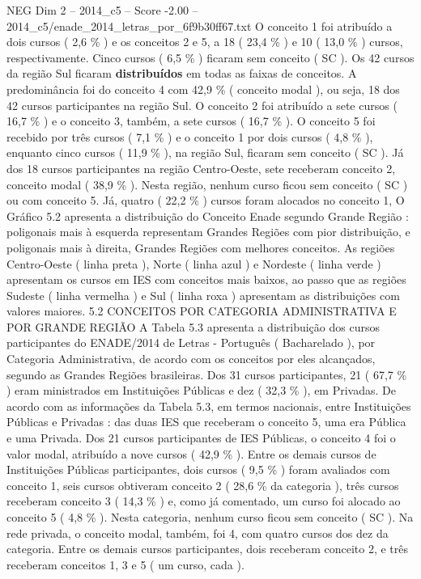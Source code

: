 \begin{textsample}{NEG Dim 2 – 2014\_c5 – Score -2.00 – 2014\_c5/enade\_2014\_letras\_por\_6f9b30ff67.txt}
O conceito 1 foi atribuído a dois cursos ( 2,6 \% ) e os conceitos 2 e 5, a 18 ( 23,4 \% ) e 10 ( 13,0 \% ) cursos, respectivamente.
Cinco cursos ( 6,5 \% ) ficaram sem conceito ( SC ).
Os 42 cursos da região Sul ficaram \textbf{distribuídos} em todas as faixas de conceitos.
A predominância foi do conceito 4 com 42,9 \% ( conceito modal ), ou seja, 18 dos 42 cursos participantes na região Sul.
O conceito 2 foi atribuído a sete cursos ( 16,7 \% ) e o conceito 3, também, a sete cursos ( 16,7 \% ).
O conceito 5 foi recebido por três cursos ( 7,1 \% ) e o conceito 1 por dois cursos ( 4,8 \% ), enquanto cinco cursos ( 11,9 \% ), na região Sul, ficaram sem conceito ( SC ).
Já dos 18 cursos participantes na região Centro-Oeste, sete receberam conceito 2, conceito modal ( 38,9 \% ).
Nesta região, nenhum curso ficou sem conceito ( SC ) ou com conceito 5.
Já, quatro ( 22,2 \% ) cursos foram alocados no conceito 1, O Gráfico 5.2 apresenta a distribuição do Conceito Enade segundo Grande Região : poligonais mais à esquerda representam Grandes Regiões com pior distribuição, e poligonais mais à direita, Grandes Regiões com melhores conceitos.
As regiões Centro-Oeste ( linha preta ), Norte ( linha azul ) e Nordeste ( linha verde ) apresentam os cursos em IES com conceitos mais baixos, ao passo que as regiões Sudeste ( linha vermelha ) e Sul ( linha roxa ) apresentam as distribuições com valores maiores. 5.2 CONCEITOS POR CATEGORIA ADMINISTRATIVA E POR GRANDE REGIÃO A Tabela 5.3 apresenta a distribuição dos cursos participantes do ENADE/2014 de Letras - Português ( Bacharelado ), por Categoria Administrativa, de acordo com os conceitos por eles alcançados, segundo as Grandes Regiões brasileiras.
Dos 31 cursos participantes, 21 ( 67,7 \% ) eram ministrados em Instituições Públicas e dez ( 32,3 \% ), em Privadas.
De acordo com as informações da Tabela 5.3, em termos nacionais, entre Instituições Públicas e Privadas : das duas IES que receberam o conceito 5, uma era Pública e uma Privada.
Dos 21 cursos participantes de IES Públicas, o conceito 4 foi o valor modal, atribuído a nove cursos ( 42,9 \% ).
Entre os demais cursos de Instituições Públicas participantes, dois cursos ( 9,5 \% ) foram avaliados com conceito 1, seis cursos obtiveram conceito 2 ( 28,6 \% da categoria ), três cursos receberam conceito 3 ( 14,3 \% ) e, como já comentado, um curso foi alocado ao conceito 5 ( 4,8 \% ).
Nesta categoria, nenhum curso ficou sem conceito ( SC ).
Na rede privada, o conceito modal, também, foi 4, com quatro cursos dos dez da categoria.
Entre os demais cursos participantes, dois receberam conceito 2, e três receberam conceitos 1, 3 e 5 ( um curso, cada ).

\end{textsample}
